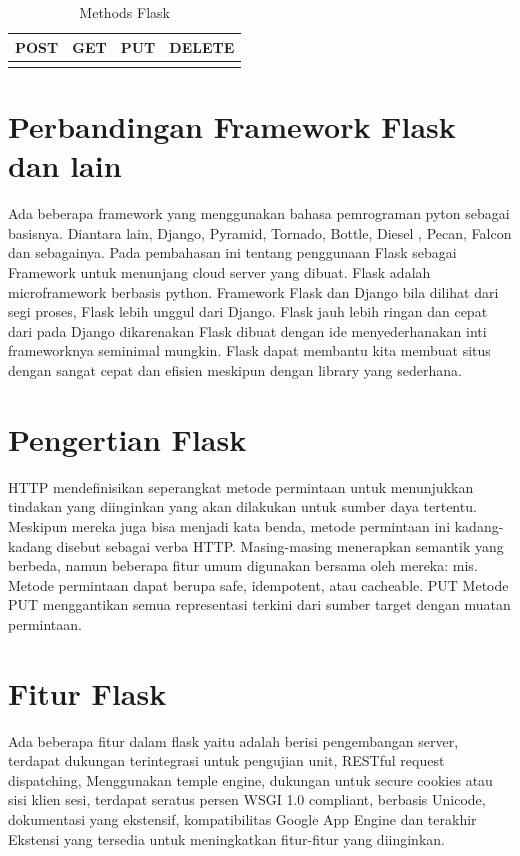 \begin{table}[h]
    \caption{Methods Flask}
    \centering
    \begin{tabular}{cccc}
    \hline
    POST&GET&PUT&DELETE\\
    \hline
    \label{methods}
    \end{tabular}
\end{table}

\section{Perbandingan Framework Flask dan lain}
Ada beberapa framework yang menggunakan bahasa pemrograman pyton sebagai basisnya. Diantara lain, Django, Pyramid, Tornado, Bottle, Diesel , Pecan, Falcon dan sebagainya.
Pada pembahasan ini tentang penggunaan Flask sebagai Framework untuk menunjang cloud server yang dibuat. 
Flask adalah microframework berbasis python. Framework Flask dan Django bila dilihat dari segi proses, Flask lebih unggul dari Django. 
Flask jauh lebih ringan dan cepat dari pada Django dikarenakan Flask dibuat dengan ide menyederhanakan inti frameworknya seminimal mungkin. 
Flask dapat membantu kita membuat situs dengan sangat cepat dan efisien meskipun dengan library yang sederhana.

\section{Pengertian Flask}
HTTP mendefinisikan seperangkat metode permintaan untuk menunjukkan tindakan yang diinginkan yang akan dilakukan untuk sumber daya tertentu. Meskipun mereka juga bisa menjadi kata benda, metode permintaan ini kadang-kadang disebut sebagai verba HTTP. Masing-masing menerapkan semantik yang berbeda, namun beberapa fitur umum digunakan bersama oleh mereka: mis. Metode permintaan dapat berupa safe, idempotent, atau cacheable.
PUT
Metode PUT menggantikan semua representasi terkini dari sumber target dengan muatan permintaan.

\section{Fitur Flask}
Ada beberapa fitur dalam flask yaitu adalah berisi pengembangan server, terdapat dukungan terintegrasi untuk pengujian unit, RESTful request dispatching, Menggunakan temple engine, 
dukungan untuk secure cookies atau sisi klien sesi, terdapat seratus persen WSGI 1.0 compliant, berbasis Unicode, dokumentasi yang ekstensif, 
kompatibilitas Google App Engine dan terakhir Ekstensi yang tersedia untuk meningkatkan fitur-fitur yang diinginkan.

